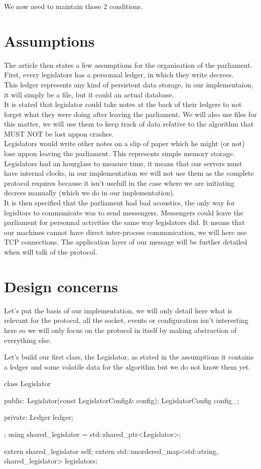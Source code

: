 \documentclass{article}
\begin{document}
We now need to maintain those 2 conditions.

\section{Assumptions}
The article then states a few assumptions for the organisation of the parliament.\\
First, every legislators has a personnal ledger, in which they write decrees.\\
This ledger represents any kind of persistent data storage, in our implementaion, it will simply be a file, but it could an actual database.\\
It is stated that legislator could take notes at the back of their ledgers to not forget what they were doing after leaving the parliament. We will also use files for this matter, we will use them to keep track of data relative to the algorithm that MUST NOT be lost uppon crashes.\\
Legislators would write other notes on a slip of paper which he might (or not) lose uppon leaving the parliament. This represents simple memory storage.\\
Legislators had an hourglass to measure time, it means that our servers must have internal clocks, in our implementation we will not use them as the complete protocol requires because it isn't usefull in the case where we are initiating decrees manually (which we do in our implementation).\\

It is then specified that the parliament had bad acoustics, the only way for legisltors to communicate was to send messengers. Messengers could leave the parliament for personnal activities the same way legislators did. It means that our machines cannot have direct inter-process communication, we will here use TCP connections.
The application layer of our message will be further detailed when will talk of the protocol.

\section{Design concerns}
Let's put the basis of our implementation, we will only detail here what is relevant for the protocol, all the socket, events or configuration isn't interesting here so we will only focus on the protocol in itself by making abstraction of everything else.

Let's build our first class, the Legislator, as stated in the assumptions it contains a ledger and some volatile data for the algorithm but we do not know them yet.
\begin{code}
class Legislator
{
public:
    Legislator(const LegislatorConfig& config);
    LegislatorConfig config_;

private:
    Ledger ledger;
};
using shared_legislator = std::shared_ptr<Legislator>;

extern shared_legislator self;
extern std::unordered_map<std::string, shared_legislator> legislators;

\end{code}
\end{document}
